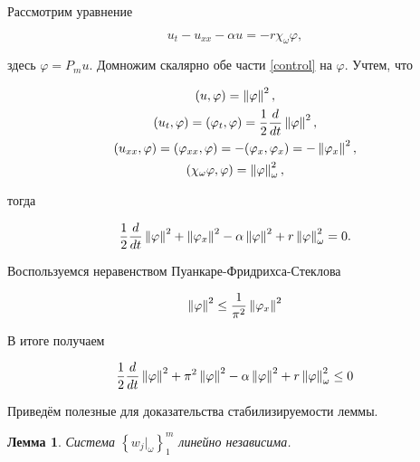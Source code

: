 Рассмотрим уравнение

\begin{equation}\label{control}
    u_t - u_{xx} - \alpha u = -r\chi_{\omega}\varphi,
\end{equation}

здесь $\varphi = P_mu$. Домножим скалярно обе части \eqref{control} на
$\varphi$. Учтем, что

\begin{gather*}
    (u, \varphi) = \left\lVert\varphi\right\rVert^2, \\*
    (u_t, \varphi) = (\varphi_t, \varphi) = \frac{1}{2} \frac{d}{dt}
    \left\lVert\varphi\right\rVert^2, \\*
    (u_{xx}, \varphi) = (\varphi_{xx}, \varphi) = -(\varphi_x, \varphi_x) = -
    \left\lVert\varphi_x\right\rVert^2, \\*
    (\chi_{\omega}\varphi, \varphi) = \left\lVert\varphi\right\rVert^2_{\omega}, 
\end{gather*}

тогда

\begin{equation*}
    \frac{1}{2} \frac{d}{dt} \left\lVert\varphi\right\rVert^2  + \left\lVert\varphi_x\right\rVert^2 - 
    \alpha \left\lVert\varphi\right\rVert^2 + r \left\lVert\varphi\right\rVert^2_{\omega} = 0.
\end{equation*}

Воспользуемся неравенством Пуанкаре-Фридрихса-Стеклова

\begin{equation}
    \left\lVert\varphi\right\rVert^2 \le \frac{1}{\pi^2} \left\lVert\varphi_x\right\rVert^2
\end{equation}

В итоге получаем

\begin{equation}
    \frac{1}{2} \frac{d}{dt} \left\lVert\varphi\right\rVert^2 + \pi^2 \left\lVert\varphi\right\rVert^2 - 
    \alpha \left\lVert\varphi\right\rVert^2 + r \left\lVert\varphi\right\rVert^2_{\omega} \le 0
\end{equation}

Приведём полезные для доказательства стабилизируемости леммы.

\newtheorem{lemma}{Лемма}

\begin{lemma}\label{util_lemma}
    Система $\left\{ w_j|_{\omega} \right\}^m_1$ линейно независима.
\end{lemma}

